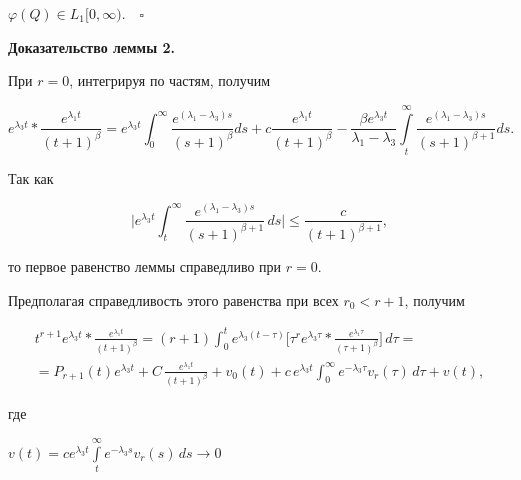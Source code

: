 $\varphi(Q)\in L_1[0,\infty)$.$\quad\square$


\bigskip





{\bf Доказательство леммы 2.}


При $r=0$, интегрируя по частям, получим


$$


e^{\lambda_3t}*\frac{e^{\lambda_1t}}{(t+1)^{\beta}}=


e^{\lambda_3t}\int_0^{\infty}\frac{e^{(\lambda_1-\lambda_3)s}}


{(s+1)^{\beta}}ds+c\frac{e^{\lambda_1t}}


{(t+1)^{\beta}}-\frac{\beta e^{\lambda_3t}}


{\lambda_1-\lambda_3}\int\limits_t^{\infty}


\frac{e^{(\lambda_1-\lambda_3)s}}{(s+1)^{\beta+1}}ds.


$$


Так как


$$


\bigg|e^{\lambda_3t} \int_t^\infty


\frac{e^{( \lambda_1-\lambda_3)s}}{(s+1)^{\beta +1}}\,ds\bigg|


\leq \frac{c}{(t+1)^{\beta +1}},


$$


то первое равенство леммы справедливо при $r=0$.


Предполагая справедливость этого равенства при всех $r_0<r+1$, получим


\begin{multline*}


t^{r+1}e^{\lambda_3t} \ast \frac{e^{\lambda_1t}}{(t+1)^\beta}=


(r+1) \int_0^t


e^{\lambda_3(t-\tau)}\bigg[\tau^re^{\lambda_3 \tau} \ast


\frac{e^{\lambda_1\tau}}{(\tau+1)^\beta}\bigg]\,d \tau=\\


%


=P_{r+1}(t)e^{\lambda_3t}+C\,\frac{e^{\lambda_1 t}}{(t+1)^\beta}+v_0(t)+c


\,e^{\lambda_3t} \int_0^\infty e^{-\lambda_3 \tau}v_r(\tau)\,d \tau+v(t),


\end{multline*}


где


$v(t)=ce^{\lambda_3t} \int \limits_t^\infty e^{-\lambda_3s}v_r(s)\,ds\to0$


